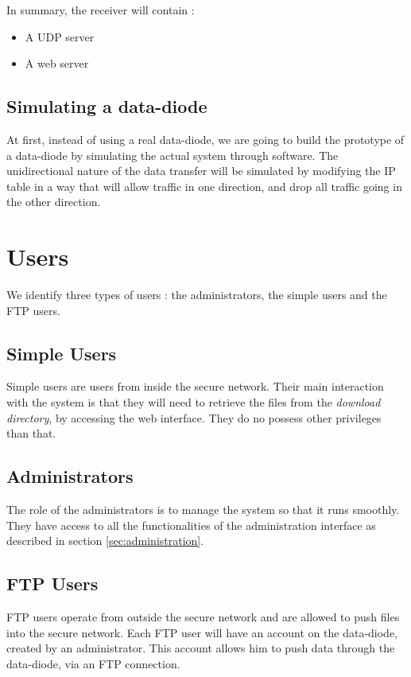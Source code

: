 \documentclass[a4paper,11pt]{article}
\begin{document}
In summary, the receiver will contain :
\begin{itemize}
\item{A UDP server}
\item{A web server}
\end{itemize}

\subsection{Simulating a data-diode}
At first, instead of using a real data-diode, we are going to build the prototype of a data-diode by simulating the actual system through software. The unidirectional nature of the data transfer will be simulated by modifying the IP table in a way that will allow traffic in one direction, and drop all traffic going in the other direction.


\section{Users}
We identify three types of users : the administrators, the simple users and the FTP users.

\subsection{Simple Users}
Simple users are users from inside the secure network. Their main interaction with the system is that they will need to retrieve the files from the \textit{download directory}, by accessing the web interface. They do no possess other privileges than that.

\subsection{Administrators}
The role of the administrators is to manage the system so that it runs smoothly. They have access to all the functionalities of the administration interface as described in section \ref{sec:administration}.

\subsection{FTP Users}
FTP users operate from outside the secure network and are allowed to push files into the secure network. Each FTP user will have an account on the data-diode, created by an administrator. This account allows him to push data through the data-diode, via an FTP connection.
\end{document}
